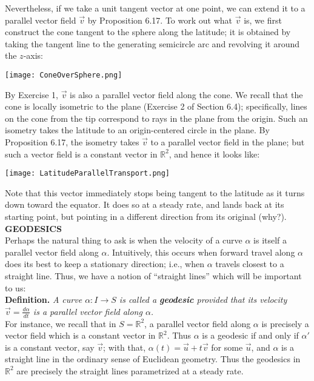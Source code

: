 \documentclass[leqno]{book}
\begin{document}
Nevertheless, if we take a unit tangent vector at one point, we can extend it to a parallel vector field $\vec v$ by Proposition 6.17.  To work out what $\vec v$ is, we first construct the cone tangent to the sphere along the latitude; it is obtained by taking the tangent line to the generating semicircle arc and revolving it around the $z$-axis:
\begin{center}
\texttt{[image: ConeOverSphere.png]}
\end{center}
By Exercise 1, $\vec v$ is also a parallel vector field along the cone.  We recall that the cone is locally isometric to the plane (Exercise 2 of Section 6.4); specifically, lines on the cone from the tip correspond to rays in the plane from the origin.  Such an isometry takes the latitude to an origin-centered circle in the plane.  By Proposition 6.17, the isometry takes $\vec v$ to a parallel vector field in the plane; but such a vector field is a constant vector in $\mathbb R^2$, and hence it looks like:
\begin{center}
\texttt{[image: LatitudeParallelTransport.png]}
\end{center}
Note that this vector immediately stops being tangent to the latitude as it turns down toward the equator.  It does so at a steady rate, and lands back at its starting point, but pointing in a different direction from its original (why?).\\ %

\noindent\textbf{GEODESICS}\\

\noindent Perhaps the natural thing to ask is when the velocity of a curve $\alpha$ is itself a parallel vector field along $\alpha$.  Intuitively, this occurs when forward travel along $\alpha$ does its best to keep a stationary direction; i.e., when $\alpha$ travels closest to a straight line.  Thus, we have a notion of ``straight lines'' which will be important to us:\\

\noindent\textbf{Definition.} \emph{A curve $\alpha:I\to S$ is called a \textbf{geodesic} provided that its velocity $\vec v=\frac{d\alpha}{dt}$ is a parallel vector field along $\alpha$.}\\

\noindent For instance, we recall that in $S=\mathbb R^2$, a parallel vector field along $\alpha$ is precisely a vector field which is a constant vector in $\mathbb R^2$.  Thus $\alpha$ is a geodesic if and only if $\alpha'$ is a constant vector, say $\vec v$; with that, $\alpha(t)=\vec u+t\vec v$ for some $\vec u$, and $\alpha$ is a straight line in the ordinary sense of Euclidean geometry.  Thus the geodesics in $\mathbb R^2$ are precisely the straight lines parametrized at a steady rate.
\end{document}
